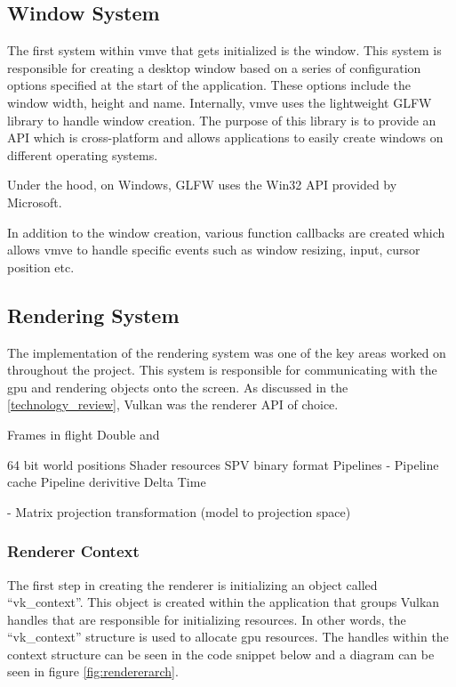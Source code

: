 \documentclass[11pt]{article}
\begin{document}
  

\subsection{Window System}
The first system within \gls*{vmve} that gets initialized is the window. This system is
responsible for creating a desktop window based on a series of configuration
options specified at the start of the application. These options include the
window width, height and name. Internally, \gls*{vmve} uses the lightweight GLFW
library to handle window creation. The purpose of this library is to provide an
API which is cross-platform and allows applications to easily create windows on
different operating systems. 

Under the hood, on Windows, GLFW uses the Win32 API provided by Microsoft.

In addition to the window creation, various function callbacks are created
which allows \gls*{vmve} to handle specific events such as window resizing, input,
cursor position etc.

\subsection{Rendering System}
The implementation of the rendering system was one of the key areas worked on
throughout the project. This system is responsible for communicating with the
\gls*{gpu} and rendering objects onto the screen. As discussed in the
\ref{technology_review}, Vulkan was the renderer API of choice. 

    Frames in flight 
    Double and

64 bit world positions 
Shader resources SPV binary format 
    Pipelines
-   Pipeline cache 
Pipeline derivitive 
Delta Time

- Matrix projection transformation (model to projection space)


\subsubsection{Renderer Context}
The first step in creating the renderer is initializing an object called
``vk\_context''. This object is created within the application that groups Vulkan
handles that are responsible for initializing resources. In other words, the
``vk\_context'' structure is used to allocate \gls*{gpu} resources. The handles
within the context structure can be seen in the code snippet below and a diagram
can be seen in figure \ref{fig:rendererarch}.
\end{document}
